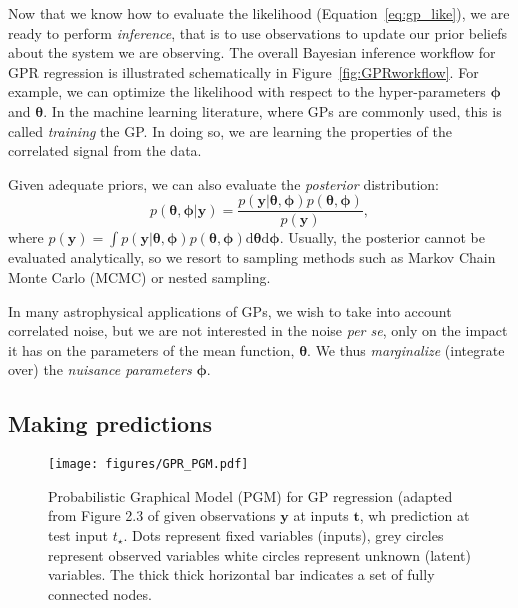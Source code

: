 \documentclass[letterpaper]{ar-1col}
\newcommand{\hyperparams}{\ensuremath{\boldsymbol{\phi}}}
\newcommand{\meanparams}{\ensuremath{\boldsymbol{\theta}}}
\begin{document}
Now that we know how to evaluate the likelihood (Equation~\ref{eq:gp_like}), we are ready to perform \textit{inference}, that is to use observations to update our prior beliefs about the system we are observing. The overall Bayesian inference workflow for GPR regression is illustrated schematically in Figure~\ref{fig:GPRworkflow}. For example, we can optimize the likelihood with respect to the hyper-parameters $\hyperparams$ and $\meanparams$. In the machine learning literature, where GPs are commonly used, this is called \emph{training} the GP. In doing so, we are learning the properties of the correlated signal from the data.

Given adequate priors, we can also evaluate the \emph{posterior} distribution:
\begin{equation}
  p(\meanparams,\hyperparams|\mathbf{y})=\frac{p(\mathbf{y}|\meanparams,\hyperparams)p(\meanparams,\hyperparams)}{p(\mathbf{y})},
\end{equation}
where $p(\mathbf{y})=\int p(\mathbf{y}|\meanparams,\hyperparams)p(\meanparams,\hyperparams) \mathrm{d}\meanparams \mathrm{d}\hyperparams$.
Usually, the posterior cannot be evaluated analytically, so we resort to sampling methods such as Markov Chain Monte Carlo (MCMC) or nested sampling.

In many astrophysical applications of GPs, we wish to take into account correlated noise, but we are not interested in the noise \emph{per se}, only on the impact it has on the parameters of the mean function, $\meanparams$. We thus \emph{marginalize} (integrate over) the \emph{nuisance parameters} $\hyperparams$.


\subsection{Making predictions}
\label{sec:pred}

\begin{figure}[ht]
  \centering
  \texttt{[image: figures/GPR\_PGM.pdf]}
  \caption{Probabilistic Graphical Model (PGM) for GP regression (adapted from Figure 2.3 of \citealt{RW07} given observations $\mathbf{y}$ at inputs $\mathbf{t}$, wh prediction at test input $t_\star$. Dots represent fixed variables (inputs), grey circles represent observed variables white circles represent unknown (latent) variables. The thick thick horizontal bar indicates a set of fully connected nodes.}
  \label{fig:GPR_PGM}
\end{figure}
\end{document}
